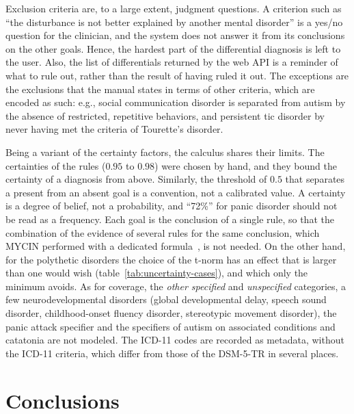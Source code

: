 Exclusion criteria are, to a large extent, judgment questions. A criterion
such as ``the disturbance is not better explained by another mental disorder''
is a yes/no question for the clinician, and the system does not answer it from
its conclusions on the other goals. Hence, the hardest part of the differential
diagnosis is left to the user. Also, the list of differentials returned by the web
API is a reminder of what to rule out, rather than the result of having ruled it
out. The exceptions are the exclusions that the manual states in terms of other
criteria, which are encoded as such: e.g., social communication disorder is
separated from autism by the absence of restricted, repetitive behaviors, and
persistent tic disorder by never having met the criteria of Tourette's
disorder.

Being a variant of the certainty factors, the calculus shares their limits. The certainties of the rules ($0.95$ to $0.98$) were chosen by hand, and they
bound the certainty of a diagnosis from above. Similarly, the threshold of $0.5$ that
separates a present from an absent goal is a convention, not a calibrated value.
A certainty is a degree of belief, not a probability, and ``72\%'' for panic
disorder should not be read as a frequency. Each goal is the conclusion of a
single rule, so that the combination of the evidence of several rules for the
same conclusion, which MYCIN performed with a dedicated
formula~\cite{shortliffe-buchanan}, is not needed. On the other hand, for the
polythetic disorders the choice of the t-norm has an effect that is larger than
one would wish (table~\ref{tab:uncertainty-cases}), and which only the minimum
avoids. As for coverage, the \emph{other specified} and \emph{unspecified}
categories, a few neurodevelopmental disorders (global developmental delay,
speech sound disorder, childhood-onset fluency disorder, stereotypic movement
disorder), the panic attack specifier and the specifiers of autism on
associated conditions and catatonia are not modeled. The ICD-11 codes are
recorded as metadata, without the ICD-11 criteria, which differ from those of
the DSM-5-TR in several places.


\section{Conclusions}

